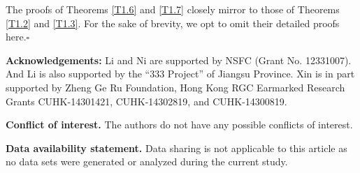 \documentclass[reqno,11pt]{amsart}
\theoremstyle{plain}
\numberwithin{equation}{section}
\begin{document}
 
 
The proofs of Theorems \ref{T1.6} and \ref{T1.7} closely mirror to those of Theorems 
\ref{T1.2} and \ref{T1.3}. For the sake of brevity, we  opt  to omit their detailed proofs here.\hfill $ \square$
 





\bigskip 
{\bf Acknowledgements:}
Li and Ni are supported by NSFC (Grant No. 12331007).  And Li is also supported by
 the ``333 Project'' of Jiangsu Province.
Xin is  in part supported by Zheng Ge Ru Foundation, Hong Kong RGC Earmarked Research 
Grants CUHK-14301421, CUHK-14302819, and CUHK-14300819. 
 
 
\vspace{2mm}

\textbf{Conflict of interest.} The authors do not have any possible conflicts of interest.


\vspace{2mm}


\textbf{Data availability statement.}
 Data sharing is not applicable to this article as no data sets were generated or analyzed 
 during the current study.


\end{document}
